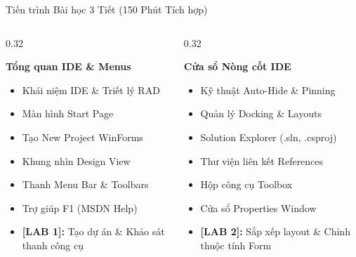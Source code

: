 \documentclass[aspectratio=169, 10pt]{beamer}
\begin{document}
\begin{frame}{Tiến trình Bài học 3 Tiết (150 Phút Tích hợp)}
  \begin{columns}[T]
    \begin{column}{0.32\textwidth}
      \begin{tcolorbox}[colback=UniNavy!5,colframe=UniNavy,title=\textbf{TIẾT 1 (50')},fonttitle=\small\bfseries]
        \textbf{Tổng quan IDE \& Menus}
        \begin{itemize}\scriptsize
          \item Khái niệm IDE \& Triết lý RAD
          \item Màn hình Start Page
          \item Tạo New Project WinForms
          \item Khung nhìn Design View
          \item Thanh Menu Bar \& Toolbars
          \item Trợ giúp F1 (MSDN Help)
          \item \textbf{[LAB 1]:} Tạo dự án \& Khảo sát thanh công cụ
        \end{itemize}
      \end{tcolorbox}
    \end{column}

    \begin{column}{0.32\textwidth}
      \begin{tcolorbox}[colback=CSharpPurple!5,colframe=CSharpPurple,title=\textbf{TIẾT 2 (50')},fonttitle=\small\bfseries]
        \textbf{Cửa sổ Nòng cốt IDE}
        \begin{itemize}\scriptsize
          \item Kỹ thuật Auto-Hide \& Pinning
          \item Quản lý Docking \& Layouts
          \item Solution Explorer (.sln, .csproj)
          \item Thư viện liên kết References
          \item Hộp công cụ Toolbox
          \item Cửa sổ Properties Window
          \item \textbf{[LAB 2]:} Sắp xếp layout \& Chỉnh thuộc tính Form
        \end{itemize}
      \end{tcolorbox}
    \end{column}


\end{columns}
\end{frame}
\end{document}
